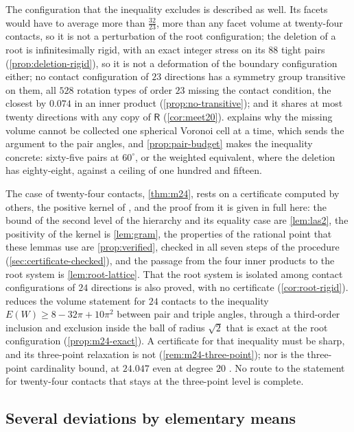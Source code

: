 \documentclass[11pt,reqno]{amsart}
\renewcommand{\_}{\origunderscore\allowbreak}
\numberwithin{equation}{section}
\theoremstyle{plain}
\theoremstyle{definition}
\theoremstyle{remark}
\newcommand{\Rt}{\mathsf{R}}                 %
\begin{document}
The configuration that the inequality excludes is described as well. Its
facets would have to average more than $\tfrac{32}{23}$, more than any facet
volume at twenty-four contacts, so it is not a perturbation of the root
configuration; the deletion of a root is infinitesimally rigid, with an
exact integer stress on its $88$ tight pairs (\cref{prop:deletion-rigid}),
so it is not a deformation of the boundary configuration either; no contact
configuration of $23$ directions has a symmetry group transitive on them,
all $528$ rotation types of order $23$ missing the contact condition, the
closest by $0.074$ in an inner product (\cref{prop:no-transitive}); and it
shares at most twenty directions with any copy of $\Rt$
(\cref{cor:meet20}).  explains why the missing
volume cannot be collected one spherical Voronoi cell at a time, which
sends the argument to the pair angles, and \cref{prop:pair-budget} makes the
inequality concrete: sixty-five pairs at $60^\circ$, or the weighted
equivalent, where the deletion has eighty-eight, against a ceiling of one
hundred and fifteen.

The case of twenty-four contacts, \cref{thm:m24}, rests on a
certificate computed by others, the positive kernel of \cite{LLM24}, and
the proof from it is given in full here: the bound of the second level of the hierarchy and its equality case
are \cref{lem:las2}, the positivity of the kernel is \cref{lem:gram}, the
properties of the rational point that these lemmas use are
\cref{prop:verified}, checked in all seven steps of the procedure
(\cref{sec:certificate-checked}), and the passage from the four inner
products to the root system is \cref{lem:root-lattice}. That the root
system is isolated among contact configurations of $24$ directions is
also proved, with no certificate (\cref{cor:root-rigid}).
 reduces the volume statement for $24$ contacts to
the inequality $E(W)\ge8-32\pi+10\pi^2$ between pair and triple angles,
through a third-order inclusion and exclusion inside the ball of radius
$\sqrt2$ that is exact at the root configuration (\cref{prop:m24-exact}).
A certificate for that inequality must be sharp, and its three-point
relaxation is not (\cref{rem:m24-three-point}); nor is the three-point
cardinality bound, at $24.047$ even at degree $20$ \cite{Lei25}. No route
to the statement for twenty-four contacts that stays at the three-point
level is complete.

\subsection{Several deviations by elementary means}
\end{document}
